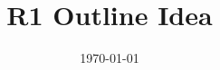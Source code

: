 \documentclass[11pt]{article}
\title{ R1 Outline Idea}
\date{\today}
\makeatletter
\newcommand\syllogism[3][]{%
  \begin{center}
  \def\tmp{#1}%
  \ifx\tmp\empty\else(#1)\quad\fi
  \begin{tabular}{@{}l@{}}
    #2\\\hline#3\quad$\therefore$
  \end{tabular}
  \end{center}
}
\makeatother
\begin{document}
\maketitle	
\pagebreak






        

        
\end{document}
